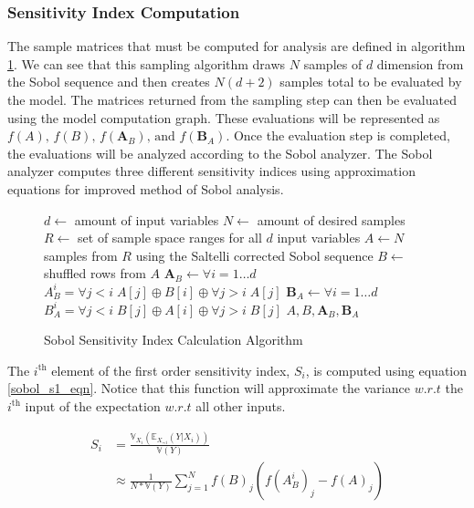 \subsubsection{Sensitivity Index Computation\label{sec:si_comp}}
The sample matrices that must be computed for analysis are defined in algorithm \ref{fig:sobol_sample_alg}. We can see that this sampling algorithm draws $N$ samples of $d$ dimension from the Sobol sequence and then creates $N(d+2)$ samples total to be evaluated by the model. The matrices returned from the sampling step can then be evaluated using the model computation graph. These evaluations will be represented as $f(A) \text{, } f(B) \text{, } f(\textbf{A}_{B}) \text{, and } f(\textbf{B}_{A})$. Once the evaluation step is completed, the evaluations will be analyzed according to the Sobol analyzer. The Sobol analyzer computes three different sensitivity indices using approximation equations for \citet{saltelli2010varianceSA} improved method of Sobol analysis.

\begin{figure}
  \label{fig:sobol_sample_alg}
    \begin{algorithmic}[1]
      \State $d \gets $ amount of input variables
      \State $N \gets $ amount of desired samples
      \State $R \gets $ set of sample space ranges for all $d$ input variables
      \State $A \gets N$ samples from $R$ using the Saltelli corrected Sobol sequence
      \State $B \gets $ shuffled rows from $A$
      \State $\textbf{A}_{B} \gets \forall i = 1 \ldots d$ $A_{B}^i = \forall j < i \; A[j] \oplus B[i] \oplus \forall j > i \; A[j]$
      \State $\textbf{B}_{A} \gets \forall i = 1 \ldots d$ $B_{A}^i = \forall j < i \; B[j] \oplus A[i] \oplus \forall j > i \; B[j]$
      \State \Return $A, B, \textbf{A}_{B}, \textbf{B}_{A}$
    \end{algorithmic}
  \caption{Sobol Sensitivity Index Calculation Algorithm}
\end{figure}


The $i^{\text{th}}$ element of the first order sensitivity index, $S_i$, is computed using equation \ref{sobol_s1_eqn}. Notice that this function will approximate the variance $w.r.t$ the $i^{\text{th}}$ input of the expectation $w.r.t$ all other inputs.

\begin{equation} \label{sobol_s1_eqn}
  \begin{split}
    S_i & = \frac{\mathbb{V}_{X_i}\left(\mathbb{E}_{X_{\sim i}}(Y | X_i) \right)}{\mathbb{V}(Y)} \\
     & \approx \frac{1}{N * \mathbb{V}(Y)} \sum_{j=1}^{N} f(B)_j\left( f(A_{B}^{i})_j - f(A)_j\right)
  \end{split}
\end{equation}

